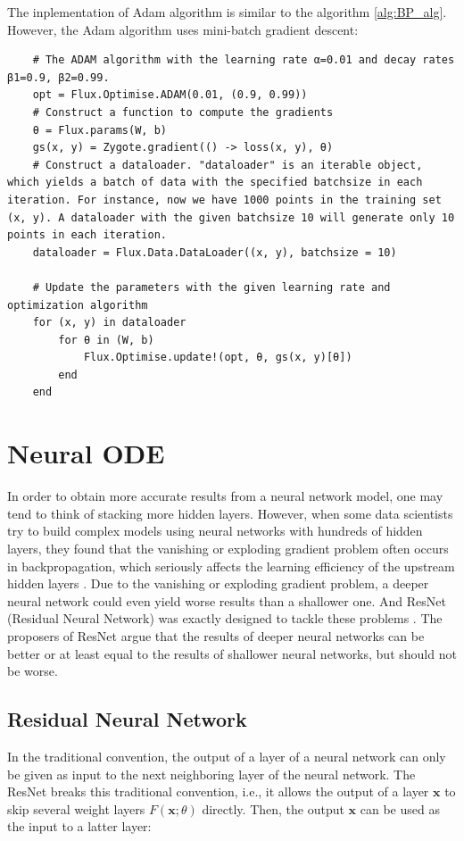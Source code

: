 \documentclass[
	parskip, 			   %
	twoside, 			   %
	DIV=14, 			   %
	BCOR=15.0mm, 		   %
	headsepline, 		   %
	open=right, 		   %
	captions=tableheading, %
	bibliography=totoc,    %
	numbers=noenddot       %
]{scrreprt}
\begin{document}
The inplementation of Adam algorithm is similar to the algorithm \ref{alg:BP_alg}. However, the Adam algorithm uses mini-batch gradient descent:

\begin{verbatim}
    # The ADAM algorithm with the learning rate α=0.01 and decay rates β1=0.9, β2=0.99.
    opt = Flux.Optimise.ADAM(0.01, (0.9, 0.99))
    # Construct a function to compute the gradients
    θ = Flux.params(W, b)
    gs(x, y) = Zygote.gradient(() -> loss(x, y), θ)
    # Construct a dataloader. "dataloader" is an iterable object, which yields a batch of data with the specified batchsize in each iteration. For instance, now we have 1000 points in the training set (x, y). A dataloader with the given batchsize 10 will generate only 10 points in each iteration.
    dataloader = Flux.Data.DataLoader((x, y), batchsize = 10)

    # Update the parameters with the given learning rate and optimization algorithm
    for (x, y) in dataloader
        for θ in (W, b) 
            Flux.Optimise.update!(opt, θ, gs(x, y)[θ])
        end
    end
\end{verbatim}

\clearpage
\chapter{Neural ODE}
\label{ch:chapter5}
In order to obtain more accurate results from a neural network model, one may tend to think of stacking more hidden layers. However, when some data scientists try to build complex models using neural networks with hundreds of hidden layers, they found that the vanishing or exploding gradient problem often occurs in backpropagation, which seriously affects the learning efficiency of the upstream hidden layers \cite{glorot2010understanding}. Due to the vanishing or exploding gradient problem, a deeper neural network could even yield worse results than a shallower one. And ResNet (Residual Neural Network) was exactly designed to tackle these problems \cite{he2016deep}. The proposers of ResNet argue that the results of deeper neural networks can be better or at least equal to the results of shallower neural networks, but should not be worse.

\section{Residual Neural Network}
In the traditional convention, the output of a layer of a neural network can only be given as input to the next neighboring layer of the neural network. The ResNet breaks this traditional convention, i.e., it allows the output of a layer $\mathbf{x}$ to skip several weight layers $F(\mathbf{x};\theta)$ directly. Then, the output $\mathbf{x}$ can be used as the input to a latter layer:
\end{document}

